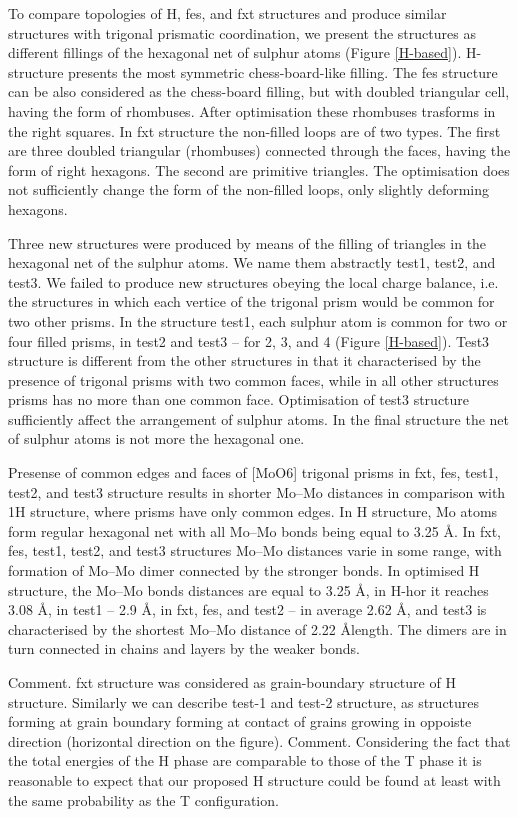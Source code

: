 \documentclass[a4paperm]{article}
\begin{document}
To compare topologies of H, fes, and fxt structures and produce similar structures with trigonal prismatic coordination, we present the structures as different fillings of the hexagonal net of sulphur atoms (Figure \ref{H-based}).
H-structure presents the most symmetric chess-board-like filling.
The fes structure can be also considered as the chess-board filling, but with doubled triangular cell, having the form of rhombuses.
After optimisation these rhombuses trasforms in the right squares.
In fxt structure the non-filled loops are of two types.
The first are three doubled triangular (rhombuses) connected through the faces, having the form of right hexagons.
The second are primitive triangles.
The optimisation does not sufficiently change the form of the non-filled loops, only slightly deforming hexagons.


Three new structures were produced by means of the filling of triangles in the hexagonal net of the sulphur atoms.
We name them abstractly test1, test2, and test3.
We failed to produce new structures obeying the local charge balance, i.e. the structures in which each vertice of the trigonal prism would be common for two other prisms.
In the structure test1, each sulphur atom is common for two or four filled prisms, in test2 and test3 – for 2, 3, and 4 (Figure \ref{H-based}).
Test3 structure is different from the other structures in that it characterised by the presence of trigonal prisms with two common faces, while in all other structures prisms has no more than one common face.
Optimisation of test3 structure sufficiently affect the arrangement of sulphur atoms.
In the final structure the net of sulphur atoms is not more the hexagonal one.

Presense of common edges and faces of [MoO6] trigonal prisms in fxt, fes, test1, test2, and test3 structure results in shorter Mo--Mo distances in comparison with 1H structure, where prisms have only common edges.
In H structure, Mo atoms form regular hexagonal net with all Mo--Mo bonds being equal to 3.25 \AA.
In fxt, fes, test1, test2, and test3 structures Mo--Mo distances varie in some range, with formation of Mo--Mo dimer connected by the stronger bonds.
In optimised H structure, the Mo--Mo bonds distances are equal to 3.25 \AA, in H-hor it reaches 3.08 \AA, in test1 -- 2.9 \AA, in fxt, fes, and test2 -- in average 2.62 \AA, and test3 is characterised by the shortest Mo--Mo distance of 2.22 \AA length. 
The dimers are in turn connected in chains and layers by the weaker bonds.

Comment. fxt structure was considered as grain-boundary structure of H structure. Similarly we can describe test-1 and test-2 structure, as structures forming at grain boundary forming at contact of grains growing in oppoiste direction (horizontal direction on the figure).
Comment. Considering the fact that the total energies of the H phase are comparable to those of the T phase it is reasonable to expect that our proposed H structure could be found at least with the same probability as the T configuration.
\end{document}
